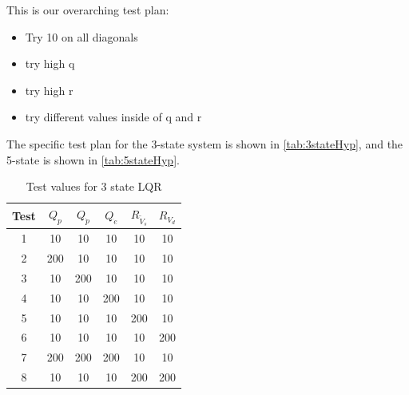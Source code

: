 This is our overarching test plan:
\begin{itemize}
    \item Try 10 on all diagonals
    \item try high q
    \item try high r
    \item try different values inside of q and r
\end{itemize}
The specific test plan for the 3-state system is shown in \autoref{tab:3stateHyp}, and the 5-state is shown in \autoref{tab:5stateHyp}.
\begin{table}[htbp]
    \centering
    \caption{Test values for 3 state LQR}
    \begin{tabular}{c|ccccc}
        \textbf{Test} & \( Q_p \) & \( Q_{\dot{p}} \) & \( Q_{\dot{e}} \) & \( R_{\tilde{V}_s} \) & \( R_{V_d} \) \\
        \hline
        1  & 10  & 10  & 10  & 10  & 10  \\
        2  & 200 & 10  & 10  & 10  & 10  \\
        3  & 10  & 200 & 10  & 10  & 10  \\
        4  & 10  & 10  & 200 & 10  & 10  \\
        5  & 10  & 10  & 10  & 200 & 10  \\
        6  & 10  & 10  & 10  & 10  & 200 \\
        7  & 200 & 200 & 200 & 10  & 10  \\
        8 & 10  & 10  & 10  & 200 & 200 \\
    \end{tabular}
    \label{tab:3stateHyp}
\end{table}

